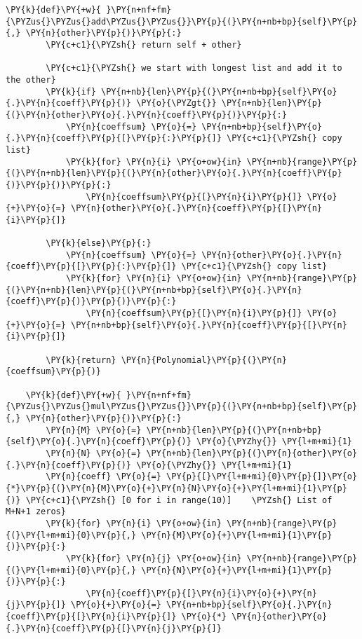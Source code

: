 \begin{example}
\begin{tcolorbox}[breakable, size=fbox, boxrule=1pt, pad at break*=1mm,colback=cellbackground, colframe=cellborder]
\begin{Verbatim}[commandchars=\\\{\}]
    \PY{k}{def}\PY{+w}{ }\PY{n+nf+fm}{\PYZus{}\PYZus{}add\PYZus{}\PYZus{}}\PY{p}{(}\PY{n+nb+bp}{self}\PY{p}{,} \PY{n}{other}\PY{p}{)}\PY{p}{:}
        \PY{c+c1}{\PYZsh{} return self + other}

        \PY{c+c1}{\PYZsh{} we start with longest list and add it to the other}
        \PY{k}{if} \PY{n+nb}{len}\PY{p}{(}\PY{n+nb+bp}{self}\PY{o}{.}\PY{n}{coeff}\PY{p}{)} \PY{o}{\PYZgt{}} \PY{n+nb}{len}\PY{p}{(}\PY{n}{other}\PY{o}{.}\PY{n}{coeff}\PY{p}{)}\PY{p}{:}
            \PY{n}{coeffsum} \PY{o}{=} \PY{n+nb+bp}{self}\PY{o}{.}\PY{n}{coeff}\PY{p}{[}\PY{p}{:}\PY{p}{]} \PY{c+c1}{\PYZsh{} copy list}
            \PY{k}{for} \PY{n}{i} \PY{o+ow}{in} \PY{n+nb}{range}\PY{p}{(}\PY{n+nb}{len}\PY{p}{(}\PY{n}{other}\PY{o}{.}\PY{n}{coeff}\PY{p}{)}\PY{p}{)}\PY{p}{:}
                \PY{n}{coeffsum}\PY{p}{[}\PY{n}{i}\PY{p}{]} \PY{o}{+}\PY{o}{=} \PY{n}{other}\PY{o}{.}\PY{n}{coeff}\PY{p}{[}\PY{n}{i}\PY{p}{]}

        \PY{k}{else}\PY{p}{:} 
            \PY{n}{coeffsum} \PY{o}{=} \PY{n}{other}\PY{o}{.}\PY{n}{coeff}\PY{p}{[}\PY{p}{:}\PY{p}{]} \PY{c+c1}{\PYZsh{} copy list}
            \PY{k}{for} \PY{n}{i} \PY{o+ow}{in} \PY{n+nb}{range}\PY{p}{(}\PY{n+nb}{len}\PY{p}{(}\PY{n+nb+bp}{self}\PY{o}{.}\PY{n}{coeff}\PY{p}{)}\PY{p}{)}\PY{p}{:}
                \PY{n}{coeffsum}\PY{p}{[}\PY{n}{i}\PY{p}{]} \PY{o}{+}\PY{o}{=} \PY{n+nb+bp}{self}\PY{o}{.}\PY{n}{coeff}\PY{p}{[}\PY{n}{i}\PY{p}{]}
            
        \PY{k}{return} \PY{n}{Polynomial}\PY{p}{(}\PY{n}{coeffsum}\PY{p}{)}

    \PY{k}{def}\PY{+w}{ }\PY{n+nf+fm}{\PYZus{}\PYZus{}mul\PYZus{}\PYZus{}}\PY{p}{(}\PY{n+nb+bp}{self}\PY{p}{,} \PY{n}{other}\PY{p}{)}\PY{p}{:}
        \PY{n}{M} \PY{o}{=} \PY{n+nb}{len}\PY{p}{(}\PY{n+nb+bp}{self}\PY{o}{.}\PY{n}{coeff}\PY{p}{)} \PY{o}{\PYZhy{}} \PY{l+m+mi}{1}
        \PY{n}{N} \PY{o}{=} \PY{n+nb}{len}\PY{p}{(}\PY{n}{other}\PY{o}{.}\PY{n}{coeff}\PY{p}{)} \PY{o}{\PYZhy{}} \PY{l+m+mi}{1}
        \PY{n}{coeff} \PY{o}{=} \PY{p}{[}\PY{l+m+mi}{0}\PY{p}{]}\PY{o}{*}\PY{p}{(}\PY{n}{M}\PY{o}{+}\PY{n}{N}\PY{o}{+}\PY{l+m+mi}{1}\PY{p}{)} \PY{c+c1}{\PYZsh{} [0 for i in range(10)]    \PYZsh{} List of M+N+1 zeros}
        \PY{k}{for} \PY{n}{i} \PY{o+ow}{in} \PY{n+nb}{range}\PY{p}{(}\PY{l+m+mi}{0}\PY{p}{,} \PY{n}{M}\PY{o}{+}\PY{l+m+mi}{1}\PY{p}{)}\PY{p}{:} 
            \PY{k}{for} \PY{n}{j} \PY{o+ow}{in} \PY{n+nb}{range}\PY{p}{(}\PY{l+m+mi}{0}\PY{p}{,} \PY{n}{N}\PY{o}{+}\PY{l+m+mi}{1}\PY{p}{)}\PY{p}{:}
                \PY{n}{coeff}\PY{p}{[}\PY{n}{i}\PY{o}{+}\PY{n}{j}\PY{p}{]} \PY{o}{+}\PY{o}{=} \PY{n+nb+bp}{self}\PY{o}{.}\PY{n}{coeff}\PY{p}{[}\PY{n}{i}\PY{p}{]} \PY{o}{*} \PY{n}{other}\PY{o}{.}\PY{n}{coeff}\PY{p}{[}\PY{n}{j}\PY{p}{]}
        

\end{Verbatim}
\end{tcolorbox}
\end{example}
